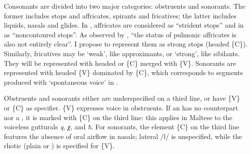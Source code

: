 \documentclass[output=paper]{langsci/langscibook}
\begin{document}

Consonants are divided into two major categories: obstruents and sonorants. The former includes stops and affricates, spirants and fricatives; the latter includes liquids, nasals and glides. In \citet[24]{JakobsonEtAl1952}, affricates are considered as “strident stops” and in \citet{Clements1999} as “noncontoured stops”. As observed by \citet[note 176]{Bellem2007}, “the status of pulmonic affricates is also not entirely clear”. I propose to represent them as strong stops (headed \{C\}). Similarly, fricatives may be ‘weak’, like approximants, or ‘strong’, like sibilants. They will be represented with headed or  \{C\} merged with  \{V\}. Sonorants are represented with headed \{V\} dominated by \{C\}, which corresponds to segments produced with ‘spontaneous voice’ in \citet{ChomskyHalle1968}.

Obstruents and sonorants either are underspecified on a third line, or have \{V\} or \{C\} as specifier. \{V\} expresses voice in obstruents. If an  has no  counterpart nor a  , it is marked with \{C\} on the third line: this applies in Maltese to the voiceless gutturals \textit{q}, \textit{χ}, and \textit{ħ}. For sonorants, the element \{C\} on the third line features the absence of oral airflow in nasals; lateral /l/ is unspecified, while the rhotic (plain or ) is specified for \{V\}.

\end{document}
